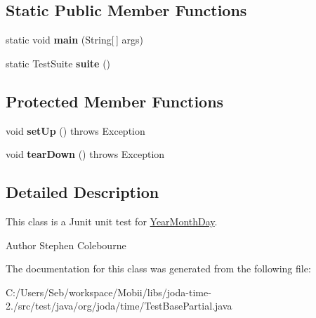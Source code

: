 \subsection*{Static Public Member Functions}
\begin{DoxyCompactItemize}
\item 
\hypertarget{classorg_1_1joda_1_1time_1_1_test_base_partial_aba3fb0baceb74e1f83f6eaba12269cd3}{static void {\bfseries main} (String\mbox{[}$\,$\mbox{]} args)}\label{classorg_1_1joda_1_1time_1_1_test_base_partial_aba3fb0baceb74e1f83f6eaba12269cd3}

\item 
\hypertarget{classorg_1_1joda_1_1time_1_1_test_base_partial_aa4ed8a08bf2cfa57aa46e620b7085e5b}{static Test\-Suite {\bfseries suite} ()}\label{classorg_1_1joda_1_1time_1_1_test_base_partial_aa4ed8a08bf2cfa57aa46e620b7085e5b}

\end{DoxyCompactItemize}
\subsection*{Protected Member Functions}
\begin{DoxyCompactItemize}
\item 
\hypertarget{classorg_1_1joda_1_1time_1_1_test_base_partial_a48aa19e128fef66e1780316a0299d58c}{void {\bfseries set\-Up} ()  throws Exception }\label{classorg_1_1joda_1_1time_1_1_test_base_partial_a48aa19e128fef66e1780316a0299d58c}

\item 
\hypertarget{classorg_1_1joda_1_1time_1_1_test_base_partial_a374e0f9aea1993c2854eea8becb616e4}{void {\bfseries tear\-Down} ()  throws Exception }\label{classorg_1_1joda_1_1time_1_1_test_base_partial_a374e0f9aea1993c2854eea8becb616e4}

\end{DoxyCompactItemize}


\subsection{Detailed Description}
This class is a Junit unit test for \hyperlink{classorg_1_1joda_1_1time_1_1_year_month_day}{Year\-Month\-Day}.

\begin{DoxyAuthor}{Author}
Stephen Colebourne 
\end{DoxyAuthor}


The documentation for this class was generated from the following file\-:\begin{DoxyCompactItemize}
\item 
C\-:/\-Users/\-Seb/workspace/\-Mobii/libs/joda-\/time-\/2./src/test/java/org/joda/time/Test\-Base\-Partial.\-java\end{DoxyCompactItemize}
